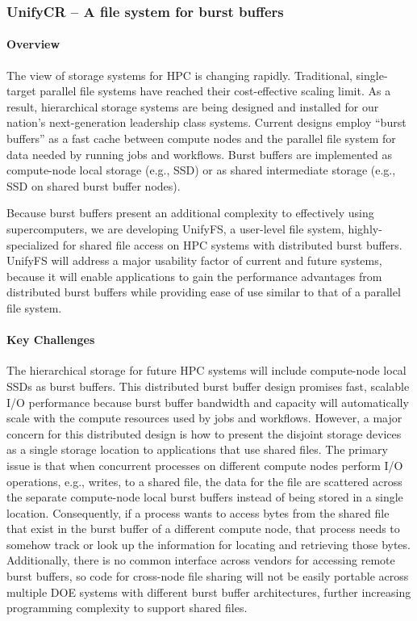 \subsubsection{ UnifyCR -- A file system for burst buffers} 

\paragraph{Overview} 

The view of storage systems for HPC is changing rapidly. Traditional, 
single-target parallel file systems have reached their cost-effective 
scaling limit. As a result, hierarchical storage systems are being designed 
and installed for our nation's next-generation leadership class systems. 
Current designs employ “burst buffers” as a fast cache between compute 
nodes and the parallel file system for data needed by running jobs and 
workflows. Burst buffers are implemented as compute-node local storage 
(e.g., SSD) or as shared intermediate storage (e.g., SSD on shared burst 
buffer nodes).

Because burst buffers present an additional complexity to effectively
using supercomputers, we are developing UnifyFS, a user-level file system, 
highly-specialized for shared file access on HPC systems with distributed 
burst buffers.  UnifyFS will address a major usability 
factor of current and future systems, because it will enable 
applications to gain the performance advantages from distributed burst buffers 
while providing ease of use similar to that of a parallel file system.


\paragraph{Key  Challenges}

The hierarchical storage for future HPC systems will include compute-node
local SSDs as burst buffers. This distributed burst buffer design promises
fast, scalable I/O performance because burst buffer bandwidth and capacity
will automatically scale with the compute resources used by jobs and
workflows. However, a major concern for this distributed design is how to
present the disjoint storage devices as a single storage location to
applications that use shared files. The primary issue is that when concurrent
processes on different compute nodes perform I/O operations, e.g., writes,
to a shared file, the data for the file are scattered across the separate
compute-node local burst buffers instead of being stored in a single
location. Consequently, if a process wants to access bytes from the
shared file that exist in the burst buffer of a different compute node,
that process needs to somehow track or look up the information for locating
and retrieving those bytes. Additionally, there is no common interface across
vendors for accessing remote burst buffers, so code for cross-node file
sharing will not be easily portable across multiple DOE systems with
different burst buffer architectures, further increasing programming
complexity to support shared files.

